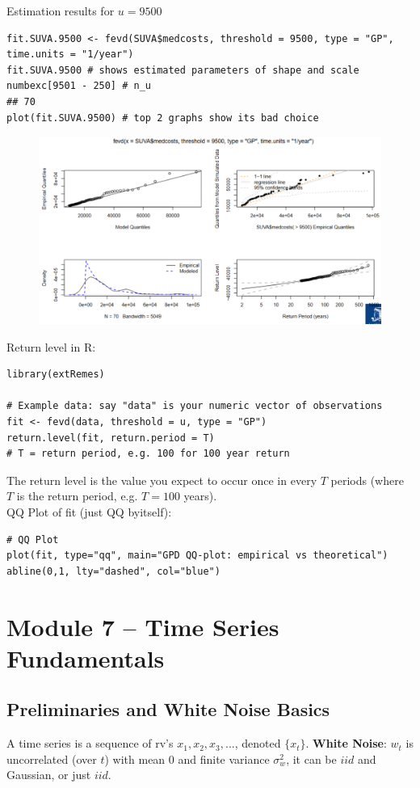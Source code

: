 \documentclass[11pt]{article}
\newcommand{\noi}{\noindent}
\begin{document}
\noi Estimation results for $u=9500$
\begin{lstlisting}
fit.SUVA.9500 <- fevd(SUVA$medcosts, threshold = 9500, type = "GP",
time.units = "1/year")
fit.SUVA.9500 # shows estimated parameters of shape and scale
numbexc[9501 - 250] # n_u
## 70
plot(fit.SUVA.9500) # top 2 graphs show its bad choice
\end{lstlisting}
\begin{figure}[H]
    \centering
    \includegraphics[width=0.7\linewidth]{GPD - example - u9500.png}
\end{figure}

\noi Return level in R:
\begin{lstlisting}
library(extRemes)

# Example data: say "data" is your numeric vector of observations
fit <- fevd(data, threshold = u, type = "GP")
return.level(fit, return.period = T)
# T = return period, e.g. 100 for 100 year return
\end{lstlisting}
\noi The return level is the value you expect to occur once in every $T$ periods (where $T$ is the return period, e.g. $T = 100$ years). \\

\noi QQ Plot of fit (just QQ byitself):
\begin{lstlisting}
# QQ Plot
plot(fit, type="qq", main="GPD QQ-plot: empirical vs theoretical")
abline(0,1, lty="dashed", col="blue")
\end{lstlisting}

\newpage
\section{Module 7 – Time Series Fundamentals}
\subsection{Preliminaries and White Noise Basics}
\noindent A time series is a sequence of rv's $x_1, x_2, x_3,...$, denoted $\{x_t\}$. \textbf{White Noise}: $w_t$ is uncorrelated (over $t$) with mean $0$ and finite variance $\sigma_w^2$, it can be $iid$ and Gaussian, or just $iid$. \\
\end{document}
